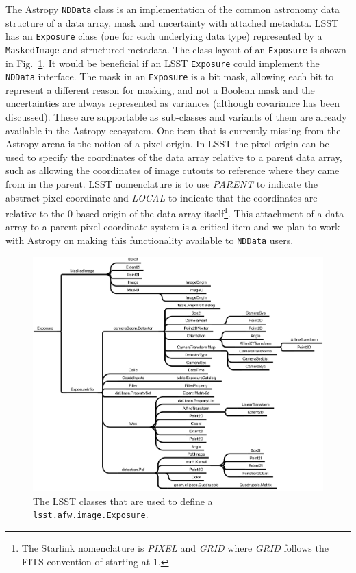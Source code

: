 \documentclass[]{spie}  %
\begin{document}
The Astropy \texttt{NDData} class is an implementation of the common astronomy data structure\cite{2015A&C....12..146J} of a data array, mask and uncertainty with attached metadata.
LSST has an \texttt{Exposure} class (one for each underlying data type) represented by a \texttt{MaskedImage} and structured metadata.
The class layout of an \texttt{Exposure} is shown in Fig.~\ref{fig:exposure}.
It would be beneficial if an LSST \texttt{Exposure} could implement the \texttt{NDData} interface.
The mask in an \texttt{Exposure} is a bit mask, allowing each bit to represent a different reason for masking, and not a Boolean mask and the uncertainties are always represented as variances (although covariance has been discussed).
These are supportable as sub-classes and variants of them are already available in the Astropy ecosystem.
One item that is currently missing from the Astropy arena is the notion of a pixel origin.
In LSST the pixel origin can be used to specify the coordinates of the data array relative to a parent data array, such as allowing the coordinates of image cutouts to reference where they came from in the parent.
LSST nomenclature is to use \emph{PARENT} to indicate the abstract pixel coordinate and \emph{LOCAL} to indicate that the coordinates are relative to the 0-based origin of the data array itself\footnote{The Starlink nomenclature\cite{2015A&C....12..146J} is \emph{PIXEL} and \emph{GRID} where \emph{GRID} follows the FITS convention of starting at 1.}.
This attachment of a data array to a parent pixel coordinate system is a critical item and we plan to work with Astropy on making this functionality available to \texttt{NDData} users.

\begin{figure} [t]
\begin{center}
\includegraphics[width=\textwidth]{exposure-dependencies}
\end{center}
\caption[layers]
{\label{fig:exposure}
The LSST classes that are used to define a \texttt{lsst.afw.image.Exposure}.}
\end{figure}
\end{document}
